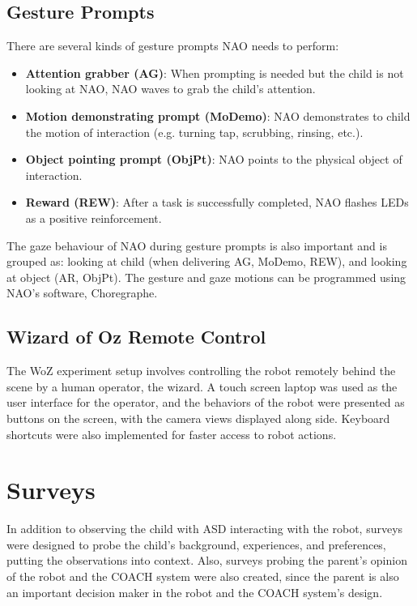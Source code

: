 \documentclass{ut-thesis}
\begin{document}
\subsection{Gesture Prompts}
There are several kinds of gesture prompts NAO needs to perform:

\begin{itemize}
	\item \textbf{Attention grabber (AG)}:  When prompting is needed but the child is not looking at NAO, NAO waves to grab the child’s attention.
	\item \textbf{Motion demonstrating prompt (MoDemo)}:  NAO demonstrates to child the motion of interaction (e.g. turning tap, scrubbing, rinsing, etc.).
	\item \textbf{Object pointing prompt (ObjPt)}:  NAO points to the physical object of interaction.
	\item \textbf{Reward (REW)}:  After a task is successfully completed, NAO flashes LEDs as a positive reinforcement.
\end{itemize}

The gaze behaviour of NAO during gesture prompts is also important and is grouped as: looking at child (when delivering AG, MoDemo, REW), and looking at object (AR, ObjPt).  The gesture and gaze motions can be programmed using NAO's software, Choregraphe.

\subsection{Wizard of Oz Remote Control}
The WoZ experiment setup involves controlling the robot remotely behind the scene by a human operator, the wizard.  A touch screen laptop was used as the user interface for the operator, and the behaviors of the robot were presented as buttons on the screen, with the camera views displayed along side.  Keyboard shortcuts were also implemented for faster access to robot actions.

\section{Surveys}
In addition to observing the child with ASD interacting with the robot, surveys were designed to probe the child's background, experiences, and preferences, putting the observations into context.  Also, surveys probing the parent's opinion of the robot and the COACH system were also created, since the parent is also an important decision maker in the robot and the COACH system's design.
\end{document}
